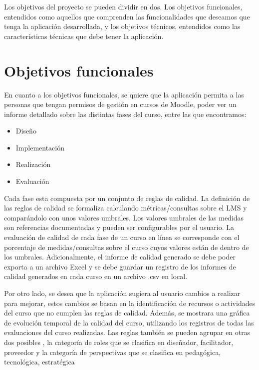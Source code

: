 
Los objetivos del proyecto se pueden dividir en dos. Los objetivos funcionales, entendidos como aquellos que comprenden las funcionalidades que deseamos que tenga la aplicación desarrollada, y los objetivos técnicos, entendidos como las características técnicas que debe tener la aplicación.

\section{Objetivos funcionales}
En cuanto a los objetivos funcionales, se quiere que la aplicación permita a las personas que tengan permisos de gestión en cursos de Moodle, poder ver un informe detallado sobre las distintas fases del curso, entre las que encontramos: 
\begin{itemize}
    \item Diseño
    \item Implementación
    \item Realización
    \item Evaluación
\end{itemize}

 Cada fase esta compuesta por un conjunto de reglas de calidad. La definición de las reglas de calidad se formaliza calculando métricas/consultas sobre el LMS y comparándolo con unos valores umbrales. Los valores umbrales de las medidas son referencias documentadas y pueden ser configurables por el usuario. La evaluación de calidad de cada fase de un curso en línea se corresponde con el  porcentaje de  medidas/consultas sobre el curso cuyos valores están de dentro de los umbrales. Adicionalmente, el informe de calidad generado se debe poder exporta a un archivo Excel y se debe guardar un registro de los informes de calidad generados en cada curso en un archivo .csv en local.

Por otro lado, se desea que la aplicación sugiera al usuario cambios a realizar para mejorar, estos cambios se basan en la identificación de recursos o actividades del curso que no cumplen las reglas de calidad. Además, se mostrara una gráfica de evolución temporal de la calidad del curso, utilizando los registros de todas las evaluaciones del curso realizadas. Las reglas también se pueden agrupar en otras dos posibles , la categoría de roles que se clasifica en diseñador, facilitador, proveedor y la categoría de perspectivas que se clasifica en pedagógica, tecnológica, estratégica

